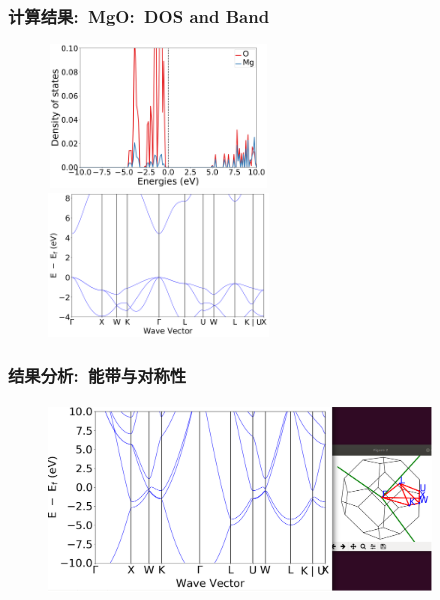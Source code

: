 \frame
{
	\frametitle{计算结果:~\textrm{MgO:~DOS and Band}}
\begin{figure}[h!]
\centering
\vspace*{-0.16in}
\includegraphics[height=1.5in,width=2.3in,viewport=0 0 900 600,clip]{Figures/Atomate_MgO-DOS.png}
\vskip 1pt
\includegraphics[height=1.5in,width=2.3in,viewport=0 0 900 600,clip]{Figures/Atomate_MgO-Band.png}
\label{Atomate_MgO-DOS}
\end{figure} 
}

\frame
{
	\frametitle{结果分析:~能带与对称性}
\begin{figure}[h!]
\centering
\includegraphics[height=2.0in,width=4.0in,viewport=0 0 1129 537,clip]{Figures/FCC_Si-k-path.png}
\label{FCC_Si-k-path}
\end{figure} 
}


